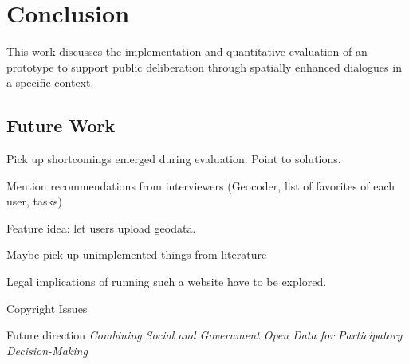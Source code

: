 \section{Conclusion}
\label{chap:conclusion}

This work discusses the implementation and quantitative evaluation of an prototype to support public deliberation through spatially enhanced dialogues in a specific context.

\subsection{Future Work}
Pick up shortcomings emerged during evaluation. Point to solutions. 

Mention recommendations from interviewers (Geocoder, list of favorites of each user, tasks)

Feature idea: let users upload geodata.

Maybe pick up unimplemented things from literature

Legal implications of running such a website have to be explored.

Copyright Issues \cite{Carver2001_PPGIS_Cyberdemocracy}


Future direction \textit{Combining Social and Government Open Data for Participatory Decision-Making}